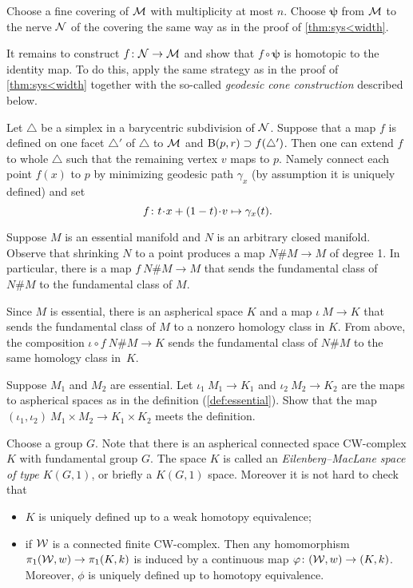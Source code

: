 Choose a fine covering of $\mathcal{M}$ with multiplicity at most $n$.
Choose $\bm{\psi}$ from $\mathcal{M}$ to the nerve $\mathcal{N}$ of the covering the same way as in the proof of \ref{thm:sys<width}.

It remains to construct $f\colon\mathcal{N}\to\mathcal{M}$ and show that $f\circ\bm{\psi}$ is homotopic to the identity map.
To do this, apply the same strategy as in the proof of \ref{thm:sys<width} together with the so-called \emph{geodesic cone construction}
described below.

Let $\triangle$ be a simplex in a barycentric subdivision of $\mathcal{N}$.
Suppose that a map $f$ is defined on one facet $\triangle'$ of $\triangle$ to $\mathcal{M}$ and $\mathrm{B}{}(p,r)\supset f(\triangle')$.
Then one can extend $f$ to whole $\triangle$ such that the remaining vertex $v$ maps to $p$.
Namely connect each point $f(x)$ to $p$ by minimizing geodesic path $\gamma_x$ (by assumption it is uniquely defined) and set
\[f
\:
t\cdot x\z+(1-t)\cdot v
\mapsto
\gamma_x(t).\]

Suppose $M$ is an essential manifold and $N$ is an arbitrary closed manifold.
Observe that shrinking $N$ to a point produces a map $N\#M\to M$ of degree 1.
In particular, there is a map $f\:N\#M\to M$ that sends the fundamental class of $N\#M$ to the fundamental class of $M$.

Since $M$ is essential, there is an aspherical space $K$ and a map $\iota\:M\to K$ that sends the fundamental class of $M$ to a nonzero homology class in $K$.
From above, the composition $\iota\circ f\:N\#M\to K$ sends the fundamental class of $N\#M$ to the same homology class in~$K$.


Suppose $M_1$ and $M_2$ are essential.
Let $\iota_1\:M_1\to K_1$ and $\iota_2\:M_2\to K_2$ are the maps to aspherical spaces as in the definition (\ref{def:essential}).
Show that the map
$(\iota_1,\iota_2)\:M_1\times M_2\to K_1\times K_2$
meets the definition.

Choose a group $G$.
Note that there is an aspherical connected space CW-complex $K$ with fundamental group $G$.
The space $K$ is called an \emph{Eilenberg--MacLane space of type $K(G,1)$}, or briefly a $K(G,1)$ space.
Moreover it is not hard to check that
\begin{itemize}
\item $K$ is uniquely defined up to a weak homotopy equivalence;
\item if $\mathcal{W}$ is a connected finite CW-complex.
Then any homomorphism $\pi_1(\mathcal{W},w)\to\pi_1(K,k)$ is induced by a continuous map $\varphi\colon(\mathcal{W},w)\to(K,k)$.
Moreover, $\phi$ is uniquely defined up to homotopy equivalence.
\end{itemize}

